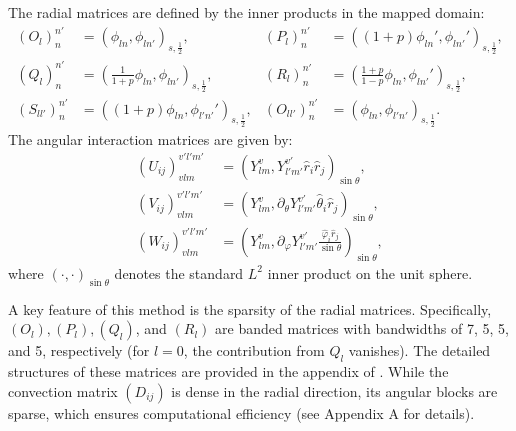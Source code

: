 \documentclass[preprint,12pt]{elsarticle}
\begin{document}
The radial matrices are defined by the inner products in the mapped domain:
\begin{align*}
    (O_l)_n^{n'} &= (\phi_{ln},\phi_{ln'})_{s,\frac{1}{2}}, & (P_l)_n^{n'} &= ((1+p)\phi_{ln}',\phi_{ln'}')_{s,\frac{1}{2}}, \\
    (Q_l)_n^{n'} &= \left(\frac{1}{1+p}\phi_{ln},\phi_{ln'}\right)_{s,\frac{1}{2}}, & (R_l)_n^{n'} &= \left(\frac{1+p}{1-p}\phi_{ln},\phi_{ln'}'\right)_{s,\frac{1}{2}}, \\
    (S_{ll'})_n^{n'} &= ((1+p)\phi_{ln},\phi_{l'n'}')_{s,\frac{1}{2}}, & (O_{ll'})_n^{n'} &= (\phi_{ln},\phi_{l'n'})_{s,\frac{1}{2}}.
\end{align*}
The angular interaction matrices are given by:
\begin{align*}
    (U_{ij})_{vlm}^{v'l'm'} &= (Y_{lm}^v, Y_{l'm'}^{v'} \hat{r}_i \hat{r}_j)_{\sin\theta}, \\
    (V_{ij})_{vlm}^{v'l'm'} &= (Y_{lm}^v, \partial_{\theta}Y_{l'm'}^{v'} \hat{\theta}_i \hat{r}_j)_{\sin\theta}, \\
    (W_{ij})_{vlm}^{v'l'm'} &= \left(Y_{lm}^v, \partial_{\varphi}Y_{l'm'}^{v'} \frac{\hat{\varphi}_i \hat{r}_j}{\sin\theta}\right)_{\sin\theta},
\end{align*}
where $(\cdot,\cdot)_{\sin\theta}$ denotes the standard $L^2$ inner product on the unit sphere.

A key feature of this method is the sparsity of the radial matrices. Specifically, $(O_l), (P_l), (Q_l)$, and $(R_l)$ are banded matrices with bandwidths of 7, 5, 5, and 5, respectively (for $l=0$, the contribution from $Q_l$ vanishes). The detailed structures of these matrices are provided in the appendix of \cite{Shen12}. While the convection matrix $(D_{ij})$ is dense in the radial direction, its angular blocks are sparse, which ensures computational efficiency (see Appendix A for details).
\end{document}
